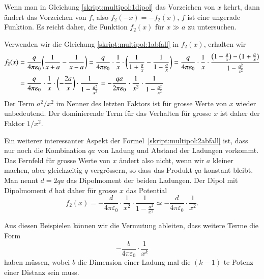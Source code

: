 Wenn man in Gleichung \eqref{skript:multipol:1dipol} das Vorzeichen
von $x$ kehrt, dann ändert das Vorzeichen von $f$, also $f_2(-x)=-f_2(x)$,
$f$ ist eine ungerade Funktion.
Es reicht daher, die Funktion $f_2(x)$ für $x\gg a$ zu untersuchen.

Verwenden wir die Gleichung \eqref{skript:multipol:1abfall} in $f_2(x)$,
erhalten wir
\begin{align}
f_2(x)
&=
\frac{q}{4\pi\varepsilon_0}\biggl(\frac1{x+a}-\frac1{x-a}\biggr)
=
\frac{q}{4\pi\varepsilon_0}\cdot\frac1x\cdot\biggl(
\frac1{1+\frac{a}{x}}
-
\frac1{1-\frac{a}{x}}
\biggr)
=
\frac{q}{4\pi\varepsilon_0}\cdot\frac1x\cdot
\frac{\bigl(1-\frac{a}{x}\bigr)-\bigl(1+\frac{a}{x}\bigr)}{1-\frac{a^2}{x^2}}
\notag
\\
&=
\frac{q}{4\pi\varepsilon_0}\cdot\frac1x\cdot
\biggl(-\frac{2a}{x}\biggr)
\cdot
\frac1{1-\frac{a^2}{x^2}}
=
-\frac{qa}{2\pi\varepsilon_0}\cdot\frac1{x^2}\cdot\frac{1}{1-\frac{a^2}{x^2}}
\label{skript:multipol:2abfall}
\end{align}
Der Term $a^2/x^2$ im Nenner des letzten Faktors ist für grosse Werte von
$x$ wieder unbedeutend.
Der dominierende Term für das Verhalten für grosse $x$ ist daher der
Faktor $1/x^2$.

Ein weiterer interessanter Aspekt der Formel~\eqref{skript:multipol:2abfall}
ist, dass nur noch die Kombination $qa$ von Ladung und Abstand der Ladungen
vorkommt.
Das Fernfeld für grosse Werte von $x$ ändert also nicht, wenn wir $a$
kleiner machen, aber gleichzeitig $q$ vergrössern, so dass das Produkt
$qa$ konstant bleibt.
Man nennt $d=2qa$ das Dipolmoment der beiden Ladungen.
Der Dipol mit Dipolmoment $d$ hat daher für grosse $x$ das Potential
\[
f_2(x)
=
-\frac{d}{4\pi\varepsilon_0}\cdot \frac1{x^2}\cdot \frac1{1-\frac{a^2}{x^2}}
\simeq
-\frac{d}{4\pi\varepsilon_0}\cdot \frac1{x^2}.
\]

Aus diesen Beispielen können wir die Vermutung ableiten, dass weitere
Terme die Form
\[
-\frac{b}{4\pi\varepsilon_0}\cdot\frac1{x^k}
\]
haben müssen, wobei $b$ die Dimension einer Ladung mal die $(k-1)$-te
Potenz einer Distanz sein muss.

